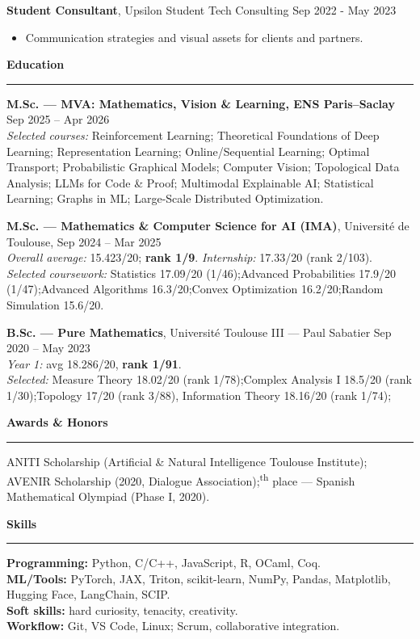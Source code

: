 \documentclass[9pt,a4paper]{extarticle}
\newcommand{\cvsection}[1]{%
  \vspace{5pt}%
  {\large\textbf{#1}}\\[-4pt]%
  \rule{\linewidth}{0.6pt}\vspace{2pt}%
}
\begin{document}
\textbf{Student Consultant}, Upsilon Student Tech Consulting \hfill Sep 2022 - May 2023
\begin{itemize}
  \item Communication strategies and visual assets for clients and partners.
\end{itemize}

\vspace{6pt}

\cvsection{Education}

\textbf{M.Sc. --- MVA: Mathematics, Vision \& Learning, ENS Paris--Saclay} \hfill Sep 2025 -- Apr 2026\\
\emph{Selected courses:}
Reinforcement Learning;\quad
Theoretical Foundations of Deep Learning;\quad
Representation Learning;\quad
Online/Sequential Learning;\quad
Optimal Transport;\quad
Probabilistic Graphical Models;\quad
Computer Vision;\quad
Topological Data Analysis;\quad
LLMs for Code \& Proof;\quad
Multimodal Explainable AI;\quad
Statistical Learning;\quad
Graphs in ML;\quad
Large-Scale Distributed Optimization.

\medskip
\textbf{M.Sc. --- Mathematics \& Computer Science for AI (IMA)}, Université de Toulouse, \hfill Sep 2024 -- Mar 2025\\
\emph{Overall average:} 15.423/20; \textbf{rank 1/9}. \;
\emph{Internship:} 17.33/20 (rank 2/103).\\
\emph{Selected coursework:} Statistics 17.09/20 (1/46);\quad Advanced Probabilities 17.9/20 (1/47);\quad Advanced Algorithms 16.3/20;\quad Convex Optimization 16.2/20;\quad Random Simulation 15.6/20.

\medskip
\textbf{B.Sc. --- Pure Mathematics}, Université Toulouse III --- Paul Sabatier \hfill Sep 2020 -- May 2023\\
\emph{Year 1:} avg 18.286/20, \textbf{rank 1/91}.\\
\emph{Selected:}
Measure Theory 18.02/20 (rank 1/78);\quad Complex Analysis I 18.5/20 (rank 1/30);\quad Topology 17/20 (rank 3/88),\quad
Information Theory 18.16/20 (rank 1/74);

\cvsection{Awards \& Honors}
ANITI Scholarship (Artificial \& Natural Intelligence Toulouse Institute);\;
AVENIR Scholarship (2020, Dialogue Association);\textsuperscript{th} place --- Spanish Mathematical Olympiad (Phase I, 2020).

\cvsection{Skills}
\textbf{Programming:} Python, C/C++, JavaScript, R, OCaml, Coq.\\
\textbf{ML/Tools:} PyTorch, JAX, Triton, scikit-learn, NumPy, Pandas, Matplotlib, Hugging Face, LangChain, SCIP.\\
\textbf{Soft skills:} hard curiosity, tenacity, creativity.\\
\textbf{Workflow:} Git, VS Code, Linux; Scrum, collaborative integration.
\end{document}
